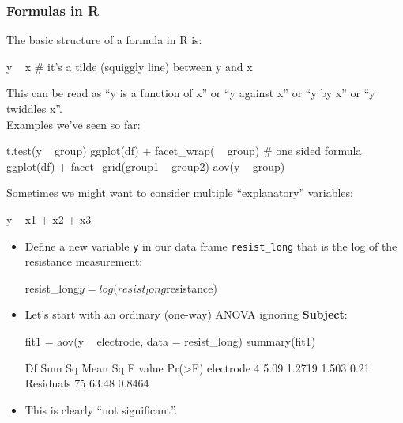 \documentclass[a4paper]{article}\usepackage[]{graphicx}\usepackage[]{xcolor}
\begin{document}
\subsubsection{Formulas in R}
The basic structure of a formula in R is:
\begin{Schunk}
\begin{Sinput}
y ~ x # it's a tilde (squiggly line) between y and x
\end{Sinput}
\end{Schunk}
This can be read as ``y is a function of x'' or ``y against x'' or ``y by x'' or ``y twiddles x''.\\
Examples we've seen so far:
\begin{Schunk}
\begin{Sinput}
t.test(y ~ group)
ggplot(df) + facet_wrap( ~ group) # one sided formula
ggplot(df) + facet_grid(group1 ~ group2)
aov(y ~ group)
\end{Sinput}
\end{Schunk}
Sometimes we might want to consider multiple ``explanatory'' variables:
\begin{Schunk}
\begin{Sinput}
y ~ x1 + x2 + x3
\end{Sinput}
\end{Schunk}
\begin{itemize}
	\item Define a new variable \lstinline|y| in our data frame \lstinline|resist_long| that is the log of the resistance measurement:
\begin{Schunk}
\begin{Sinput}
resist_long$y = log(resist_long$resistance)
\end{Sinput}
\end{Schunk}
	\item Let's start with an ordinary (one-way) ANOVA ignoring \textcolor{myred}{\textbf{Subject}}:
\begin{Schunk}
\begin{Sinput}
fit1 = aov(y ~ electrode, data = resist_long)
summary(fit1)
\end{Sinput}
\begin{Soutput}
            Df Sum Sq Mean Sq F value Pr(>F)
electrode    4   5.09  1.2719   1.503   0.21
Residuals   75  63.48  0.8464               
\end{Soutput}
\end{Schunk}
	\item This is clearly ``not significant''.
\end{itemize}
\end{document}
